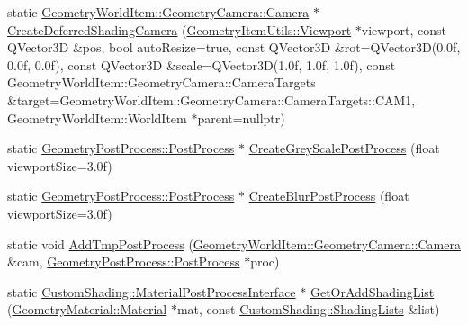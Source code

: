 \begin{DoxyCompactItemize}
\item 
static \mbox{\hyperlink{class_geometry_engine_1_1_geometry_world_item_1_1_geometry_camera_1_1_camera}{Geometry\+World\+Item\+::\+Geometry\+Camera\+::\+Camera}} $\ast$ \mbox{\hyperlink{class_geometry_engine_1_1_geometry_factory_afbfcaa9d976ed404393d9d87ac096665}{Create\+Deferred\+Shading\+Camera}} (\mbox{\hyperlink{class_geometry_engine_1_1_geometry_item_utils_1_1_viewport}{Geometry\+Item\+Utils\+::\+Viewport}} $\ast$viewport, const Q\+Vector3D \&pos, bool auto\+Resize=true, const Q\+Vector3D \&rot=Q\+Vector3D(0.\+0f, 0.\+0f, 0.\+0f), const Q\+Vector3\+D \&scale=\+Q\+Vector3\+D(1.\+0f, 1.\+0f, 1.\+0f), const Geometry\+World\+Item\+::\+Geometry\+Camera\+::\+Camera\+Targets \&target=\+Geometry\+World\+Item\+::\+Geometry\+Camera\+::\+Camera\+Targets\+::\+C\+A\+M1, Geometry\+World\+Item\+::\+World\+Item $\ast$parent=nullptr)
\item 
static \mbox{\hyperlink{class_geometry_engine_1_1_geometry_post_process_1_1_post_process}{Geometry\+Post\+Process\+::\+Post\+Process}} $\ast$ \mbox{\hyperlink{class_geometry_engine_1_1_geometry_factory_ae22f129b89273bd47bbb9537901a818a}{Create\+Grey\+Scale\+Post\+Process}} (float viewport\+Size=3.\+0f)
\item 
static \mbox{\hyperlink{class_geometry_engine_1_1_geometry_post_process_1_1_post_process}{Geometry\+Post\+Process\+::\+Post\+Process}} $\ast$ \mbox{\hyperlink{class_geometry_engine_1_1_geometry_factory_afe48a638a03829d843c9ac22f4ba3606}{Create\+Blur\+Post\+Process}} (float viewport\+Size=3.\+0f)
\item 
static void \mbox{\hyperlink{class_geometry_engine_1_1_geometry_factory_a50fd72b5c91709daea566d8f233abb23}{Add\+Tmp\+Post\+Process}} (\mbox{\hyperlink{class_geometry_engine_1_1_geometry_world_item_1_1_geometry_camera_1_1_camera}{Geometry\+World\+Item\+::\+Geometry\+Camera\+::\+Camera}} \&cam, \mbox{\hyperlink{class_geometry_engine_1_1_geometry_post_process_1_1_post_process}{Geometry\+Post\+Process\+::\+Post\+Process}} $\ast$proc)
\item 
static \mbox{\hyperlink{class_geometry_engine_1_1_custom_shading_1_1_material_post_process_interface}{Custom\+Shading\+::\+Material\+Post\+Process\+Interface}} $\ast$ \mbox{\hyperlink{class_geometry_engine_1_1_geometry_factory_a720e4765b1b51527a9f51dfdd76f741e}{Get\+Or\+Add\+Shading\+List}} (\mbox{\hyperlink{class_geometry_engine_1_1_geometry_material_1_1_material}{Geometry\+Material\+::\+Material}} $\ast$mat, const \mbox{\hyperlink{namespace_geometry_engine_1_1_custom_shading_a9bfcbfb6d734e4d6fb8e2c661b987db6}{Custom\+Shading\+::\+Shading\+Lists}} \&list)

\end{DoxyCompactItemize}
